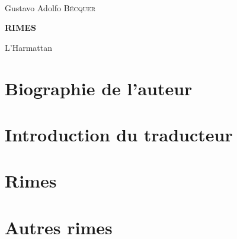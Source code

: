 \documentclass[a4paper,fontsize=13pt,twoside,final]{scrbook}
\begin{document}
\pagestyle{empty}





\cleardoublepage
\
\cleardoublepage
\
\cleardoublepage
\

\begin{center}
  {\Large Gustavo Adolfo \textsc{Bécquer}}
\end{center}

\bigskip\bigskip\bigskip\bigskip\bigskip\bigskip

\begin{center}
  {\Huge\textbf{RIMES}}
\end{center}

\bigskip\bigskip\bigskip

\vfill
\begin{center}
L'Harmattan
\end{center}

\clearpage

\pagestyle{plain}


\part{Biographie de l'auteur}


\part{Introduction du traducteur}



\part{Rimes}


\part{Autres rimes}


\bigskip

\tableofcontents
\end{document}
